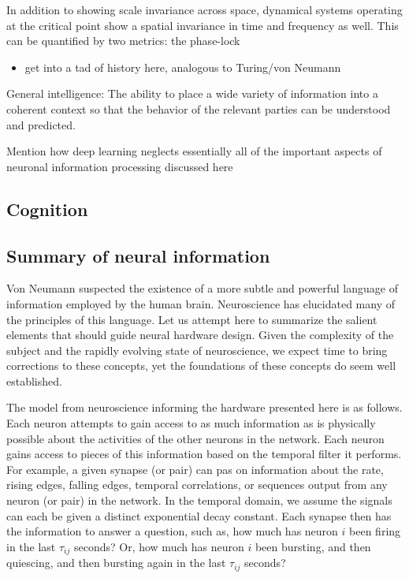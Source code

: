 \documentclass[twocolumn]{article}
\begin{document}
In addition to showing scale invariance across space, dynamical systems operating at the critical point show a spatial invariance in time and frequency as well. This can be quantified by two metrics: the phase-lock

\begin{itemize}
\item get into a tad of history here, analogous to Turing/von Neumann
\end{itemize}

General intelligence: The ability to place a wide variety of information into a coherent context so that the behavior of the relevant parties can be understood and predicted.

Mention how deep learning neglects essentially all of the important aspects of neuronal information processing discussed here

\subsection{\label{sec:cognition}Cognition}

\subsection{Summary of neural information}
Von Neumann suspected the existence of a more subtle and powerful language of information employed by the human brain. Neuroscience has elucidated many of the principles of this language. Let us attempt here to summarize the salient elements that should guide neural hardware design. Given the complexity of the subject and the rapidly evolving state of neuroscience, we expect time to bring corrections to these concepts, yet the foundations of these concepts do seem well established.

The model from neuroscience informing the hardware presented here is as follows. Each neuron attempts to gain access to as much information as is physically possible about the activities of the other neurons in the network. Each neuron gains access to pieces of this information based on the temporal filter it performs. For example, a given synapse (or pair) can pas on information about the rate, rising edges, falling edges, temporal correlations, or sequences output from any neuron (or pair) in the network. In the temporal domain, we assume the signals can each be given a distinct exponential decay constant. Each synapse then has the information to answer a question, such as, how much has neuron $i$ been firing in the last $\tau_{ij}$ seconds? Or, how much has neuron $i$ been bursting, and then quiescing, and then bursting again in the last $\tau_{ij}$ seconds? 
\end{document}
